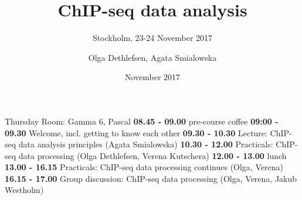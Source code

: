 \documentclass{beamer}\usepackage[]{graphicx}\usepackage[]{color}
\title[ChIP-seq]{ChIP-seq data analysis}
\subtitle{Stockholm, 23-24 November 2017}
\author[Olga]{Olga Dethlefsen, Agata Smialowska}
\institute[NBIS]{NBIS, National Bioinformatics Infrastructure Sweden\\}
\date[November 2017]{November 2017}
\begin{document}
\begin{frame}
\date{}
\titlepage
\end{frame}

\logo{}

\begin{frame}
\begin{block}{Thursday}
\scriptsize
\vspace{4mm}
Room: Gamma 6, Pascal \newline \newline
\textbf{08.45 - 09.00} pre-course coffee \newline \newline
\textbf{09:00 - 09.30} Welcome, incl. getting to know each other \newline \newline
\textbf{09.30 - 10.30} Lecture: ChIP-seq data analysis principles (Agata Smialowska) \newline \newline
\textbf{10.30 - 12.00} Practicals: ChIP-seq data processing (Olga Dethlefsen, Verena Kutschera) \newline \newline
\textbf{12.00 - 13.00} lunch \newline \newline
\textbf{13.00 - 16.15} Practicals: ChIP-seq data processing continues (Olga, Verena) \newline \newline
\textbf{16.15 - 17.00} Group discussion: ChIP-seq data processing (Olga, Verena, Jakub Westholm) \newline \newline
\end{block}
\end{frame}
\end{document}
